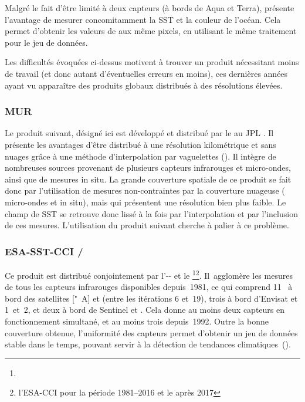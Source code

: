 Malgré le fait d'être limité à deux capteurs (à bords de Aqua et Terra),  présente l'avantage de mesurer concomitamment la SST et la couleur de l'océan.
Cela permet d'obtenir les valeurs de  aux même pixels, en utilisant le même traitement pour le jeu de données.


Les difficultés évoquées ci-dessus motivent à trouver un produit nécessitant moins de travail (et donc autant d'éventuelles erreurs en moins), ces dernières années ayant vu apparaître des produits globaux distribués à des résolutions élevées.

\subsubsection{MUR}

Le produit suivant, désigné ici  est développé et distribué par le  au JPL  .
Il présente les avantages d'être distribué à une résolution kilométrique et sans nuages grâce à une méthode d'interpolation par vaguelettes (\cite{chin_2017}).
Il intègre de nombreuses sources provenant de plusieurs capteurs infrarouges et micro-ondes, ainsi que de mesures in situ.
La grande couverture spatiale de ce produit se fait donc par l'utilisation de mesures non-contraintes par la couverture nuageuse ( micro-ondes et in situ), mais qui présentent une résolution bien plus faible.
Le champ de SST se retrouve donc lissé à la fois par l'interpolation et par l'inclusion de ces mesures.
L'utilisation du produit suivant cherche à palier à ce problème.

\subsubsection{ESA-SST-CCI / }

Ce produit est distribué conjointement par l'-- et le \footnote{}\multfootsep\footnote{%
  l'ESA-CCI pour la période 1981--2016 et le  après 2017
}.
Il~agglomère les mesures de tous les capteurs infrarouges disponibles depuis~1981, ce qui comprend 11~ à bord des satellites ["~A] et  (entre les itérations 6 et~19), trois  à bord d'Envisat et  1~et~2, et deux  à bord de Sentinel  et .
Cela donne au moins deux capteurs en fonctionnement simultané, et au moins trois depuis~1992.
Outre la bonne couverture obtenue, l'uniformité des capteurs permet d'obtenir un jeu de données stable dans le temps, pouvant servir à la détection de tendances climatiques~(\cite{merchant_2019}).

